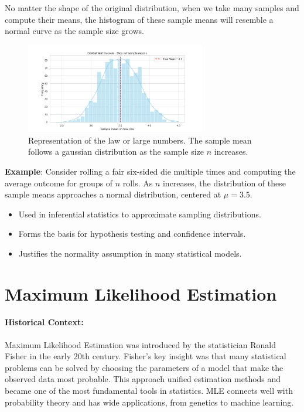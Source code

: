 \documentclass{book}
\begin{document}
No matter the shape of the original distribution, when we take many samples and compute their means, the histogram of these sample means will resemble a normal curve as the sample size grows.

\begin{figure}[ht]
    \centering
    \includegraphics[width=0.7\textwidth]{figures/chapter3/central_limit_theorem.png}
    \caption{Representation of the law or large numbers. The sample mean follows a gaussian distribution as the sample size $n$ increases.}
    \label{fig:random}
\end{figure}

\textbf{Example}: Consider rolling a fair six-sided die multiple times and computing the average outcome for groups of $n$ rolls. As $n$ increases, the distribution of these sample means approaches a normal distribution, centered at $\mu=3.5$.\\

\begin{itemize}
    \item Used in inferential statistics to approximate sampling distributions.
    \item Forms the basis for hypothesis testing and confidence intervals.
    \item Justifies the normality assumption in many statistical models.
\end{itemize}

\newpage

\section{Maximum Likelihood Estimation}

\paragraph{Historical Context:}
Maximum Likelihood Estimation was introduced by the statistician Ronald Fisher in the early 20th century. Fisher’s key insight was that many statistical problems can be solved by choosing the parameters of a model that make the observed data most probable. This approach unified estimation methods and became one of the most fundamental tools in statistics. MLE connects well with probability theory and has wide applications, from genetics to machine learning.
\end{document}
